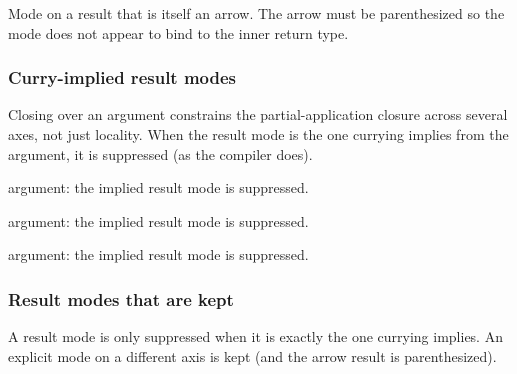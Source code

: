 \medbreak
\label{Oxcaml--val-mode_arrow_result}\begin{ocamlindent}Mode on a result that is itself an arrow. The arrow must be parenthesized so the mode does not appear to bind to the inner return type.\end{ocamlindent}%
\medbreak
\subsubsection{Curry-implied result modes\label{Oxcaml--curry-implied-result-modes}}%
Closing over an argument constrains the partial-application closure across several axes, not just locality. When the result mode is the one currying implies from the argument, it is suppressed (as the compiler does).

\label{Oxcaml--val-curry_once}\begin{ocamlindent} argument: the implied  result mode is suppressed.\end{ocamlindent}%
\medbreak
\label{Oxcaml--val-curry_portable}\begin{ocamlindent} argument: the implied result mode is suppressed.\end{ocamlindent}%
\medbreak
\label{Oxcaml--val-curry_contended}\begin{ocamlindent} argument: the implied result mode is suppressed.\end{ocamlindent}%
\medbreak
\subsubsection{Result modes that are kept\label{Oxcaml--result-modes-that-are-kept}}%
A result mode is only suppressed when it is exactly the one currying implies. An explicit mode on a different axis is kept (and the arrow result is parenthesized).

